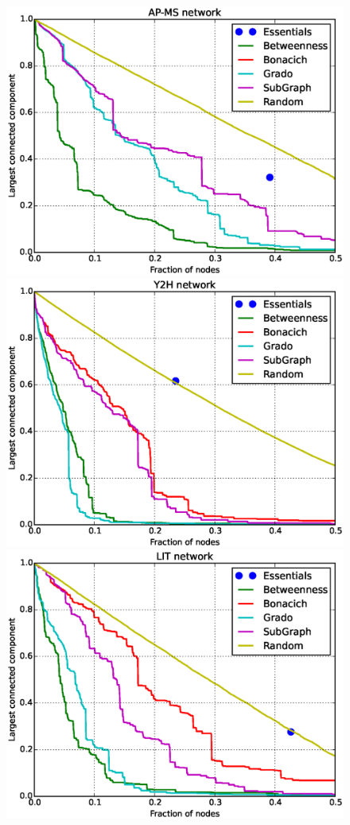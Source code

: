 \begin{figure}
\centering
\includegraphics[scale = 0.30]{figuras/AP-MS_b} 
\includegraphics[scale = 0.30]{figuras/Y2H_b} \\
\includegraphics[scale = 0.30]{figuras/LIT_b} 

\end{figure}
